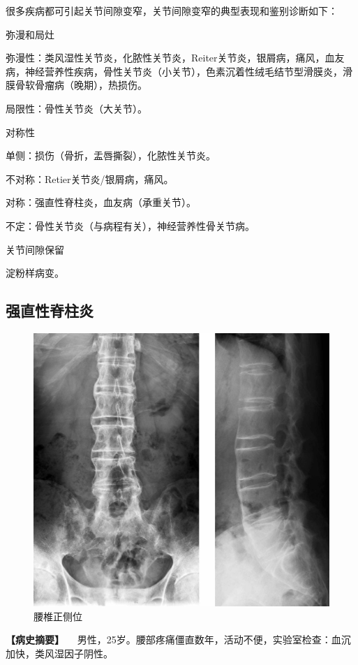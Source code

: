 很多疾病都可引起关节间隙变窄，关节间隙变窄的典型表现和鉴别诊断如下：

弥漫和局灶

弥漫性：类风湿性关节炎，化脓性关节炎，Reiter关节炎，银屑病，痛风，血友病，神经营养性疾病，骨性关节炎（小关节），色素沉着性绒毛结节型滑膜炎，滑膜骨软骨瘤病（晚期），热损伤。

局限性：骨性关节炎（大关节）。

对称性

单侧：损伤（骨折，盂唇撕裂），化脓性关节炎。

不对称：Retier关节炎/银屑病，痛风。

对称：强直性脊柱炎，血友病（承重关节）。

不定：骨性关节炎（与病程有关），神经营养性骨关节病。

关节间隙保留

淀粉样病变。

\subsection{强直性脊柱炎}

\begin{figure}[!htbp]
 \centering
 \includegraphics{./images/Image00117.jpg}
 \captionsetup{justification=centering}
 \caption{腰椎正侧位}
 \label{fig2-8-3}
  \end{figure} 

\textbf{【病史摘要】}
　男性，25岁。腰部疼痛僵直数年，活动不便，实验室检查：血沉加快，类风湿因子阴性。

